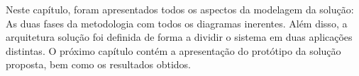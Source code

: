 Neste capítulo, foram apresentados todos os aspectos da modelagem da solução: As duas fases da metodologia com todos os diagramas inerentes. Além disso, a arquitetura solução foi definida de forma a dividir o sistema em duas aplicações distintas. O próximo capítulo contém a apresentação do protótipo da solução proposta, bem como os resultados obtidos.























